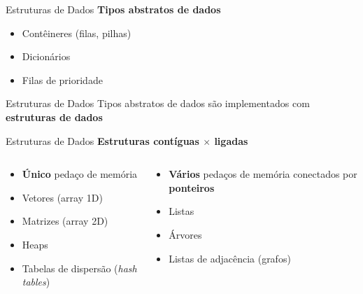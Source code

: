 \documentclass[10pt]{beamer}
\subtitle{Aula 3}
\date{08 de novembro de 2019}
\begin{document}
\maketitle

\begin{frame}{Estruturas de Dados}
  \huge
  \textbf{Tipos abstratos de dados}
  \vfill
  \begin{itemize}
    \item Contêineres (filas, pilhas)
    \item Dicionários
    \item Filas de prioridade
  \end{itemize}
\end{frame}

\begin{frame}{Estruturas de Dados}
  \huge
  Tipos abstratos de dados são implementados com \textbf{estruturas de dados}

\end{frame}

\begin{frame}{Estruturas de Dados}
  \huge
  \textbf{Estruturas contíguas $\times$ ligadas}
  \vfill
  \large
  \begin{columns}
    \begin{column}{0.49\textwidth}
      \begin{itemize}
        \item \textbf{Único} pedaço de memória
        \item Vetores (array 1D)
        \item Matrizes (array 2D)
        \item Heaps
        \item Tabelas de dispersão (\textit{hash tables})
      \end{itemize}

    \end{column}
    \begin{column}{0.49\textwidth}
      \begin{itemize}
        \item \textbf{Vários} pedaços de memória conectados por \textbf{ponteiros}
        \item Listas
        \item Árvores
        \item Listas de adjacência (grafos)
      \end{itemize}

    \end{column}
  \end{columns}
\end{frame}
\end{document}

